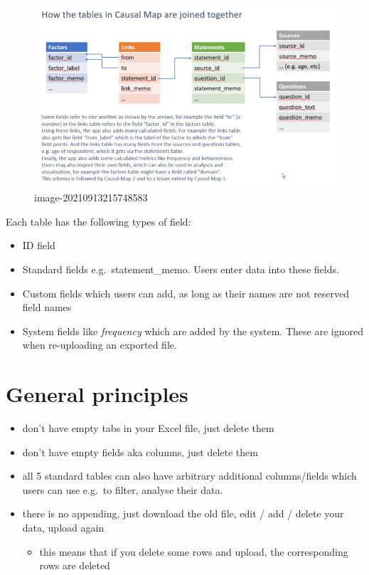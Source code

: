 \documentclass[
]{book}
\providecommand{\tightlist}{%
  \setlength{\itemsep}{0pt}\setlength{\parskip}{0pt}}
\begin{document}
\begin{figure}
\centering
\includegraphics{_assets/image-20210913215748583.png}
\caption{image-20210913215748583}
\end{figure}

Each table has the following types of field:

\begin{itemize}
\tightlist
\item
  ID field
\item
  Standard fields e.g.~statement\_memo. Users enter data into these fields.
\item
  Custom fields which users can add, as long as their names are not reserved field names
\item
  System fields like \emph{frequency} which are added by the system. These are ignored when re-uploading an exported file.
\end{itemize}

\hypertarget{general-principles}{%
\section{General principles}\label{general-principles}}

\begin{itemize}
\tightlist
\item
  don't have empty tabs in your Excel file, just delete them
\item
  don't have empty fields aka columns, just delete them
\item
  all 5 standard tables can also have arbitrary additional columns/fields which users can use e.g.~to filter, analyse their data.
\item
  there is no appending, just download the old file, edit / add / delete your data, upload again

  \begin{itemize}
  \tightlist
  \item
    this means that if you delete some rows and upload, the corresponding rows are deleted
  \end{itemize}
\end{itemize}
\end{document}
